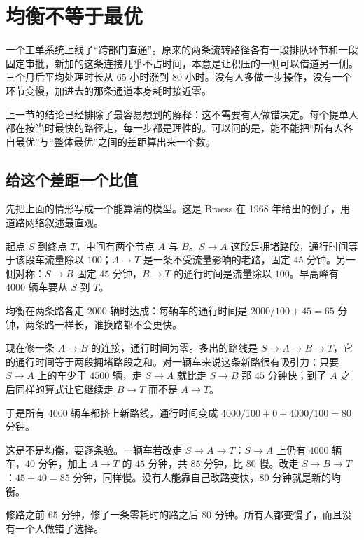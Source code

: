 \section{均衡不等于最优}
\label{sec:17-Constrained-Guarantees/06-Games-and-Equilibria/03}

一个工单系统上线了``跨部门直通''。原来的两条流转路径各有一段排队环节和一段固定审批，新加的这条连接几乎不占时间，本意是让积压的一侧可以借道另一侧。三个月后平均处理时长从 \(65\) 小时涨到 \(80\) 小时。没有人多做一步操作，没有一个环节变慢，加进去的那条通道本身耗时接近零。

上一节的结论已经排除了最容易想到的解释：这不需要有人做错决定。每个提单人都在按当时最快的路径走，每一步都是理性的。可以问的是，能不能把``所有人各自最优''与``整体最优''之间的差距算出来一个数。

\subsection{给这个差距一个比值}

先把上面的情形写成一个能算清的模型。这是 Braess 在 1968 年给出的例子，用道路网络叙述最直观。

起点 \(S\) 到终点 \(T\)，中间有两个节点 \(A\) 与 \(B\)。\(S\to A\) 这段是拥堵路段，通行时间等于该段车流量除以 \(100\)；\(A\to T\) 是一条不受流量影响的老路，固定 \(45\) 分钟。另一侧对称：\(S\to B\) 固定 \(45\) 分钟，\(B\to T\) 的通行时间是流量除以 \(100\)。早高峰有 \(4000\) 辆车要从 \(S\) 到 \(T\)。

均衡在两条路各走 \(2000\) 辆时达成：每辆车的通行时间是 \(2000/100+45=65\) 分钟，两条路一样长，谁换路都不会更快。

现在修一条 \(A\to B\) 的连接，通行时间为零。多出的路线是 \(S\to A\to B\to T\)，它的通行时间等于两段拥堵路段之和。对一辆车来说这条新路很有吸引力：只要 \(S\to A\) 上的车少于 \(4500\) 辆，走 \(S\to A\) 就比走 \(S\to B\) 那 \(45\) 分钟快；到了 \(A\) 之后同样的算式让它继续走 \(B\to T\) 而不是 \(A\to T\)。

于是所有 \(4000\) 辆车都挤上新路线，通行时间变成 \(4000/100+0+4000/100=80\) 分钟。

这是不是均衡，要逐条验。一辆车若改走 \(S\to A\to T\)：\(S\to A\) 上仍有 \(4000\) 辆车，\(40\) 分钟，加上 \(A\to T\) 的 \(45\) 分钟，共 \(85\) 分钟，比 \(80\) 慢。改走 \(S\to B\to T\)：\(45+40=85\) 分钟，同样慢。没有人能靠自己改路变快，\(80\) 分钟就是新的均衡。

修路之前 \(65\) 分钟，修了一条零耗时的路之后 \(80\) 分钟。所有人都变慢了，而且没有一个人做错了选择。

